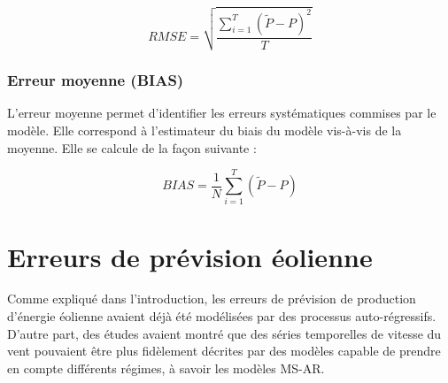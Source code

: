 \documentclass[12pt, french]{report}
\begin{document}
\begin{equation}
	RMSE = \sqrt{ \frac{\sum_{i=1}^{T} {\left( \widetilde{P} - P \right) } ^2 }{T}}
\end{equation}


\subsection{Erreur moyenne (BIAS)}
\label{subsec:Model_Metric_BIAS}
L'erreur moyenne permet d'identifier les erreurs systématiques commises par le modèle. Elle correspond à l'estimateur du biais du modèle vis-à-vis de la moyenne. Elle se calcule de la façon suivante :

\begin{equation}
BIAS = \frac{1}{N} \sum_{i=1}^{T} {\left( \widetilde{P} - P \right) }
\end{equation}


%
%
 


\chapter{Erreurs de prévision éolienne}
\label{chap:ResultatsEolien}


Comme expliqué dans l'introduction, les erreurs de prévision de production d'énergie éolienne avaient déjà été modélisées par des processus auto-régressifs. D'autre part, des études avaient montré que des séries temporelles de vitesse du vent pouvaient être plus fidèlement décrites par des modèles capable de prendre en compte différents régimes, à savoir les modèles MS-AR.   
\end{document}
